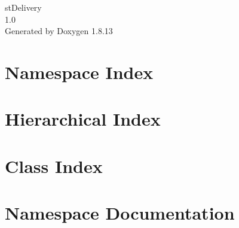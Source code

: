 \documentclass[twoside]{book}
\newcommand{\+}{\discretionary{\mbox{\scriptsize$\hookleftarrow$}}{}{}}
\newcommand{\clearemptydoublepage}{%
  \newpage{\pagestyle{empty}\cleardoublepage}%
}
\begin{document}
\hypersetup{pageanchor=false,
             bookmarksnumbered=true,
             pdfencoding=unicode
            }
\begin{titlepage}
\vspace*{7cm}
\begin{center}%
{\Large st\+Delivery \\[1ex]\large 1.\+0 }\\
\vspace*{1cm}
{\large Generated by Doxygen 1.8.13}\\
\end{center}
\end{titlepage}
\clearemptydoublepage
{}
\tableofcontents
\clearemptydoublepage
{}
\hypersetup{pageanchor=true}

\chapter{Namespace Index}

\chapter{Hierarchical Index}

\chapter{Class Index}

\chapter{Namespace Documentation}




\end{document}
